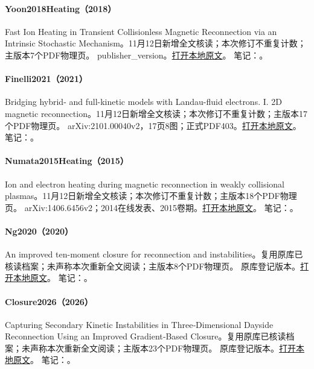 \paragraph{Yoon2018Heating（2018）}\label{paper:Yoon2018Heating}
Fast Ion Heating in Transient Collisionless Magnetic Reconnection via an Intrinsic Stochastic Mechanism。11月12日新增全文核读；本次修订不重复计数；主版本7个PDF物理页。
publisher\_version。\href{run:../../papers/Yoon2018Heating.pdf}{打开本地原文}。
笔记：。\par\smallskip
\paragraph{Finelli2021（2021）}\label{paper:Finelli2021}
Bridging hybrid- and full-kinetic models with Landau-fluid electrons. I. 2D magnetic reconnection。11月12日新增全文核读；本次修订不重复计数；主版本17个PDF物理页。
arXiv:2101.00040v2，17页8图；正式PDF403。\href{run:../../papers/Finelli2021.pdf}{打开本地原文}。
笔记：。\par\smallskip
\paragraph{Numata2015Heating（2015）}\label{paper:Numata2015Heating}
Ion and electron heating during magnetic reconnection in weakly collisional plasmas。11月12日新增全文核读；本次修订不重复计数；主版本18个PDF物理页。
arXiv:1406.6456v2；2014在线发表、2015卷期。\href{run:../../papers/Numata2015Heating.pdf}{打开本地原文}。
笔记：。\par\smallskip
\paragraph{Ng2020（2020）}\label{paper:Ng2020}
An improved ten-moment closure for reconnection and instabilities。复用原库已核读档案；未声称本次重新全文阅读；主版本8个PDF物理页。
原库登记版本。\href{run:../../papers/Ng2020.pdf}{打开本地原文}。
笔记：。\par\smallskip
\paragraph{Closure2026（2026）}\label{paper:Closure2026}
Capturing Secondary Kinetic Instabilities in Three‐Dimensional Dayside Reconnection Using an Improved Gradient‐Based Closure。复用原库已核读档案；未声称本次重新全文阅读；主版本23个PDF物理页。
原库登记版本。\href{run:../../papers/Closure2026.pdf}{打开本地原文}。
笔记：。\par\smallskip
